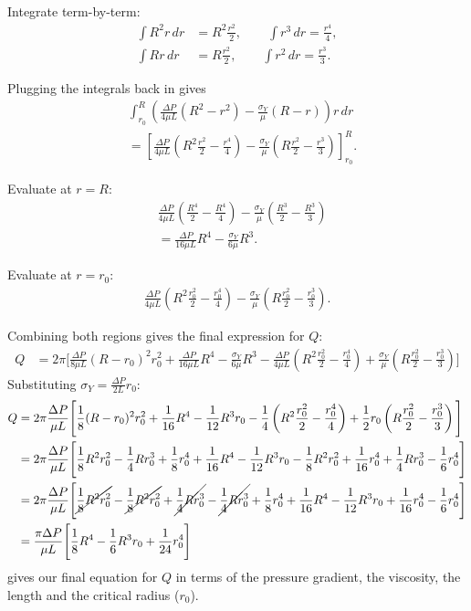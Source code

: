 \documentclass[12pt, a4paper]{article}
\numberwithin{equation}{section}
\begin{document}
Integrate term-by-term:
\begin{align*}
\int R^2 r\,dr &= R^2\frac{r^2}{2}, \qquad
\int r^3\,dr = \frac{r^4}{4}, \\
\int Rr\,dr &= R\frac{r^2}{2}, \qquad
\int r^2\,dr = \frac{r^3}{3}.
\end{align*}

Plugging the integrals back in gives
\begin{align*}
&\int_{r_0}^R \left(\frac{\Delta P}{4\mu L}(R^2 - r^2) - \frac{\sigma_Y}{\mu}(R - r)\right) r\,dr \\
&=
\left[
\frac{\Delta P}{4\mu L}\left(R^2\frac{r^2}{2} - \frac{r^4}{4}\right)
- \frac{\sigma_Y}{\mu}\left(R\frac{r^2}{2} - \frac{r^3}{3}\right)
\right]_{r_0}^{R}.
\end{align*}

Evaluate at $r=R$:
\begin{align*}
&\frac{\Delta P}{4\mu L}\left(\frac{R^4}{2} - \frac{R^4}{4}\right)
- \frac{\sigma_Y}{\mu}\left(\frac{R^3}{2} - \frac{R^3}{3}\right) \\
&= \frac{\Delta P}{16\mu L}R^4 - \frac{\sigma_Y}{6\mu}R^3.
\end{align*}

Evaluate at $r=r_0$:
\begin{align*}
\frac{\Delta P}{4\mu L}\left(R^2\frac{r_0^2}{2} - \frac{r_0^4}{4}\right)
- \frac{\sigma_Y}{\mu}\left(R\frac{r_0^2}{2} - \frac{r_0^3}{3}\right).
\end{align*}

Combining both regions gives the final expression for $Q$:
\begin{align*}
Q
&= 2\pi \Bigg[
\frac{\Delta P}{8\mu L}(R - r_0)^2 r_0^2
+ \frac{\Delta P}{16\mu L}R^4 - \frac{\sigma_Y}{6\mu}R^3
- \frac{\Delta P}{4\mu L}\left(R^2\frac{r_0^2}{2} - \frac{r_0^4}{4}\right)
+ \frac{\sigma_Y}{\mu}\left(R\frac{r_0^2}{2} - \frac{r_0^3}{3}\right)
\Bigg]
\end{align*}
Substituting $\sigma_Y = \frac{\Delta P}{2L}r_0$:
\begin{align*}
Q
&= 2\pi \frac{\Delta P}{\mu L}\Bigg[
  \frac{1}{ 8}(R - r_0)^2 r_0^2
+ \frac{1}{16}R^4 
- \frac{1}{12}R^3r_0
- \frac{1}{ 4}\left(R^2\frac{r_0^2}{2} - \frac{r_0^4}{4}\right)
+ \frac{1}{ 2}r_0\left(R\frac{r_0^2}{2} - \frac{r_0^3}{3}\right)
\Bigg]
\\
&= 2\pi \frac{\Delta P}{\mu L}
\Bigg[
  \frac{1}{ 8}R^2r_0^2 
- \frac{1}{ 4}Rr_0^3
+ \frac{1}{ 8}r_0^4
+ \frac{1}{16}R^4 
- \frac{1}{12}R^3r_0 
- \frac{1}{8}R^2r_0^2 
+ \frac{1}{16}r_0^4
+ \frac{1}{4}Rr_0^3
- \frac{1}{6}r_0^4
\Bigg]
\\
&= 2\pi \frac{\Delta P}{\mu L}
\Bigg[
\cancel{\frac{1}{8}R^2r_0^2} 
- \cancel{\frac{1}{8}R^2r_0^2}
+ \cancel{\frac{1}{4}Rr_0^3}
- \cancel{\frac{1}{4}Rr_0^3}
+ \frac{1}{8}r_0^4
+ \frac{1}{16}R^4 
- \frac{1}{12}R^3r_0 
+ \frac{1}{16}r_0^4
- \frac{1}{6}r_0^4
\Bigg]
\\
&= \frac{\pi \Delta P}{\mu L}
\Bigg[
  \frac{1}{8}R^4 
- \frac{1}{6}R^3r_0
+ \frac{1}{24}r_0^4
\Bigg]
\end{align*}
gives our final equation for $Q$ in terms of the pressure gradient, the viscosity, the length and the critical radius ($r_0$).
\end{document}
